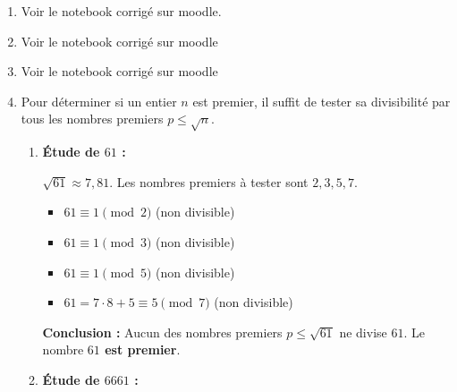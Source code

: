 \begin{enumerate}[label=\thechapter.\arabic*, font=\bfseries, itemsep=7mm,labelsep*=3mm,left=0mm]
\item Voir le notebook corrigé sur moodle.

\item Voir le notebook corrigé sur moodle

\item Voir le notebook corrigé sur moodle

\item Pour déterminer si un entier $n$ est premier, il suffit de tester sa divisibilité par tous les nombres premiers $p \le \sqrt{n}$.

\begin{enumerate}[label=\textbf{\arabic*)}, leftmargin=*]
	\item \textbf{Étude de $61$ :}
	
	$\sqrt{61} \approx 7{,}81$. Les nombres premiers à tester sont $2, 3, 5, 7$.
	\begin{itemize}
		\item $61 \equiv 1 \pmod 2$ (non divisible)
		\item $61 \equiv 1 \pmod 3$ (non divisible)
		\item $61 \equiv 1 \pmod 5$ (non divisible)
		\item $61 = 7 \cdot 8 + 5 \equiv 5 \pmod 7$ (non divisible)
	\end{itemize}
	\textbf{Conclusion :} Aucun des nombres premiers $p \le \sqrt{61}$ ne divise $61$. Le nombre \textbf{$61$ est premier}.
	
	
	\item \textbf{Étude de $6661$ :}
	

\end{enumerate}
\end{enumerate}

